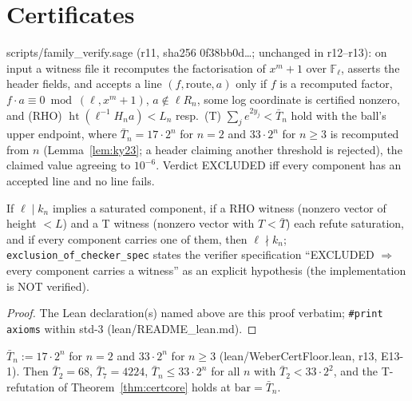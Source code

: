\chapter{Certificates}\label{ch:cert}
\begin{definition}\label{def:verifier}
scripts/family\_verify.sage (r11, sha256 0f38bb0d\ldots; unchanged in r12--r13): on input a witness file it recomputes the factorisation of $x^m+1$ over $\mathbb{F}_\ell$, asserts the header fields, and accepts a line $(f,\mathrm{route},a)$ only if $f$ is a recomputed factor, $f\cdot a\equiv0\bmod(\ell,x^m+1)$, $a\notin\ell R_n$, some log coordinate is certified nonzero, and (RHO) $\operatorname{ht}(\ell^{-1}H_na)<L_n$ resp.\ (T) $\sum_j e^{2y_j}<\bar T_n$ hold with the ball's upper endpoint, where $\bar T_n=17\cdot2^n$ for $n=2$ and $33\cdot2^n$ for $n\ge3$ is recomputed from $n$ (Lemma~\ref{lem:ky23}; a header claiming another threshold is rejected), the claimed value agreeing to $10^{-6}$. Verdict EXCLUDED iff every component has an accepted line and no line fails.
\end{definition}
\begin{theorem}\label{thm:certcore}\leanok
If $\ell\mid k_n$ implies a saturated component, if a RHO witness (nonzero vector of height $<L$) and a T witness (nonzero vector with $T<\bar T$) each refute saturation, and if every component carries one of them, then $\ell\nmid k_n$; \texttt{exclusion\_of\_checker\_spec} states the verifier specification ``EXCLUDED $\Rightarrow$ every component carries a witness'' as an explicit hypothesis (the implementation is NOT verified).
\end{theorem}
\begin{proof}\leanok

The Lean declaration(s) named above are this proof verbatim; \texttt{\#print axioms} within std-3 (lean/README\_lean.md).
\end{proof}
\begin{lemma}\label{lem:barT}\leanok
$\bar T_n:=17\cdot2^n$ for $n=2$ and $33\cdot2^n$ for $n\ge3$ (lean/WeberCertFloor.lean, r13, E13-1). Then $\bar T_2=68$, $\bar T_7=4224$, $\bar T_n\le33\cdot2^n$ for all $n$ with $\bar T_2<33\cdot2^2$, and the T-refutation of Theorem~\ref{thm:certcore} holds at $\mathrm{bar}=\bar T_n$.
\end{lemma}
